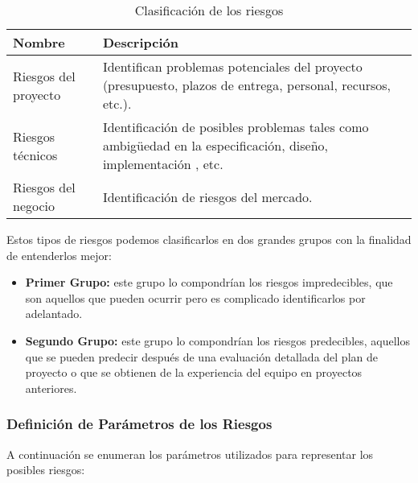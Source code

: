 \begin{table}[H]
\begin{center}
\begin{tabular}{p{} p{11cm}}
\textbf{Nombre} & \textbf{Descripción}  \\ \hline
Riesgos del proyecto & Identifican problemas potenciales del proyecto (presupuesto, plazos de entrega, personal, recursos, etc.).\\
Riesgos técnicos &  Identificación de posibles problemas tales como ambigüedad en la especificación, diseño, implementación , etc.\\
Riesgos del negocio &  Identificación de riesgos del mercado. \\ \hline
\end{tabular}
\caption{Clasificación de los riesgos}
\label{clasificacionRiesgos}
\end{center}
\end{table}

\par Estos tipos de riesgos podemos clasificarlos en dos grandes grupos con la finalidad de entenderlos mejor:

\begin{itemize}[-]
  \item \textbf{Primer Grupo:} este grupo lo compondrían los riesgos impredecibles, que son aquellos que pueden ocurrir pero es complicado identificarlos por adelantado.
  \item \textbf{Segundo Grupo:} este grupo lo compondrían los riesgos predecibles, aquellos que se pueden predecir después de una evaluación detallada del plan de proyecto o que se obtienen de la experiencia del equipo en proyectos anteriores.
\end{itemize}

\subsubsection{Definición de Parámetros de los Riesgos}
\par A continuación se enumeran los parámetros utilizados para representar los posibles riesgos:

